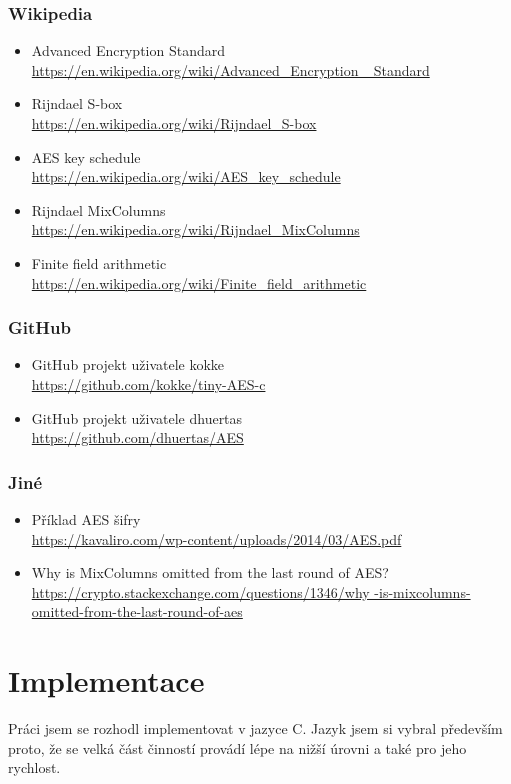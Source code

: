 \documentclass[12pt]{article}
\begin{document}
\subsubsection{Wikipedia}
\begin{itemize}
	\item Advanced Encryption Standard\\
		\sloppy
		\url{https://en.wikipedia.org/wiki/Advanced\_Encryption
		\_Standard}
	\item Rijndael S-box\\
		\url{https://en.wikipedia.org/wiki/Rijndael\_S-box}
	\item AES key schedule\\
		\url{https://en.wikipedia.org/wiki/AES\_key\_schedule}
	\item Rijndael MixColumns\\
		\url{https://en.wikipedia.org/wiki/Rijndael\_MixColumns}
	\item Finite field arithmetic\\
		\url{https://en.wikipedia.org/wiki/Finite\_field\_arithmetic}
\end{itemize}
\subsubsection{GitHub}
\begin{itemize}
	\item GitHub projekt uživatele kokke\\
		\url{https://github.com/kokke/tiny-AES-c}
	\item GitHub projekt uživatele dhuertas\\
		\url{https://github.com/dhuertas/AES}
\end{itemize}
\subsubsection{Jiné}
\begin{itemize}
	\item Příklad AES šifry\\
		\url{https://kavaliro.com/wp-content/uploads/2014/03/AES.pdf}
	\item Why is MixColumns omitted from the last round of AES?\\
		\sloppy
		\url{https://crypto.stackexchange.com/questions/1346/why
		-is-mixcolumns-omitted-from-the-last-round-of-aes}
\end{itemize}
%
%
\section{Implementace}
Práci jsem se rozhodl implementovat v jazyce C. Jazyk jsem si vybral především
proto, že se velká část činností provádí lépe na nižší úrovni a také pro
jeho rychlost.
\end{document}
